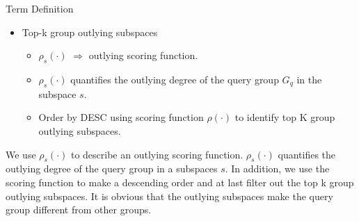 \documentclass[
size=14pt,
paper=smartboard,  %
mode=present, 		%
display=slides, 	%
style=tuliplab,  	%
pauseslide,
fleqn,leqno]{powerdot}
\begin{document}
	
	\begin{slide}[toc=,bm=]{Term Definition}
		\begin{itemize}
			\item
			Top-k group outlying subspaces
			
			\begin{itemize}
				\item
				$\rho_s(\cdot)$ $\Rightarrow$ outlying scoring function.
				
				\item
				$\rho_s(\cdot)$ quantifies the outlying degree of the
				query group $G_q$ in the subspace $s$.
				
				\item
				Order by DESC using scoring function $\rho(\cdot)$
				to identify top K group outlying subspaces.
			\end{itemize}
		\end{itemize}
		
		\begin{figure}[htbp]
			\centering
			\label{fig:Basketball-Example}
		\end{figure}
		
		\begin{note}
			We use $\rho_s(\cdot)$ to describe an outlying scoring function.
			$\rho_s(\cdot)$ quantifies the outlying degree of the query group in a subspaces $s$.
			In addition,
			we use the scoring function to make a descending order and at last
			filter out the top k group outlying subspaces.
			It is obvious that the outlying subspaces make the
			query group different from other groups.
		\end{note}
		
	\end{slide}
	
\end{document}
